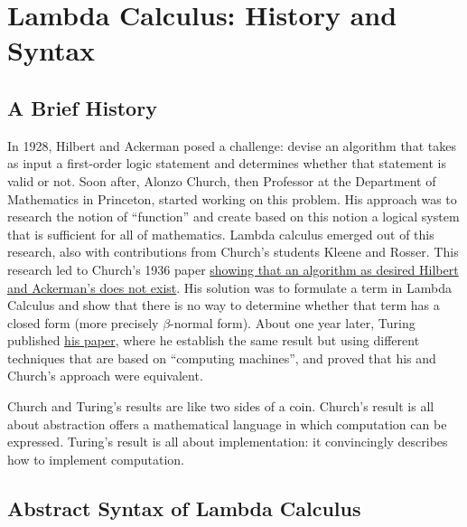 \chapter{Lambda Calculus: History and Syntax}
\label{ch:lcs}


\section{A Brief History}
\label{sec:lcs::history}

\begin{gram}
\label{grm:lcs::history}
In 1928, Hilbert and Ackerman posed a challenge: devise an algorithm that takes as input a  first-order logic statement and determines whether that statement is valid or not.
%
Soon after, Alonzo Church, then Professor at the Department of Mathematics in Princeton, 
started working on this problem.  His approach was to research the notion of ``function'' and create based on this notion a logical system that is sufficient for all of mathematics.
%
Lambda calculus emerged out of this research, also with contributions from 
Church's students Kleene and Rosser.
%
This research led to Church's 1936 paper 
\href{http://www.umut-acar.org/greats/church-1936.pdf}{showing that an algorithm as desired Hilbert and Ackerman's does not exist}.
%
His solution was to formulate a term in Lambda Calculus and show that there is no way to determine whether that term has a closed form (more precisely $\beta$-normal form). 
%
About one year later, Turing published \href{http://www.umut-acar.org/greats/turing-1937.pdf}{his paper}, where he establish the same result but using different techniques that are based on ``computing machines'', and 
%
proved that his and Church's approach were equivalent.

\end{gram}

\begin{gram}
\label{grm:lcs::church-and-turing}
Church and Turing's results are like two sides of a coin.  
%
Church's result is all about abstraction  offers a mathematical language in which computation can be expressed.
%
Turing's result is all about implementation: it convincingly describes how to implement computation.
\end{gram}

\section{Abstract Syntax of Lambda Calculus}
\label{sec:lcs::syn} 

